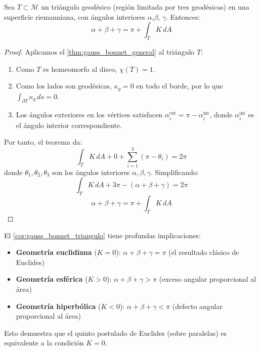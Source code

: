 \begin{corollary}\label{cor:gauss_bonnet_triangulo}
Sea $T \subset \mathcal{M}$ un triángulo geodésico (región limitada por tres geodésicas) en una superficie riemanniana, con ángulos interiores $\alpha$,$\beta$, $\gamma$. Entonces:
\begin{equation}\label{eq:gauss_bonnet_triangulo_apendice}
\alpha + \beta + \gamma = \pi + \int_T K \, dA
\end{equation}
\end{corollary}

\begin{proof}
Aplicamos el \autoref{thm:gauss_bonnet_general} al triángulo $T$:
\begin{enumerate}
    \item Como $T$ es homeomorfo al disco, $\chi(T) = 1$.
    \item Como los lados son geodésicas, $\kappa_g = 0$ en todo el borde, por lo  que $\int_{\partial T} \kappa_g \, ds = 0$.
    \item Los ángulos exteriores en los vértices satisfacen $\alpha_i^{\text{ext}} = \pi - \alpha_i^{\text{int}}$, donde $\alpha_i^{\text{int}}$ es el ángulo interior correspondiente.
\end{enumerate}

Por tanto, el teorema da:
\[
\int_T K \, dA + 0 + \sum_{i=1}^3 (\pi - \theta_i) = 2\pi
\]
donde $\theta_1, \theta_2, \theta_3$ son los ángulos interiores $\alpha, \beta, \gamma$. Simplificando:
\[
\int_T K \, dA + 3\pi - (\alpha + \beta + \gamma) = 2\pi
\]
\[
\alpha + \beta + \gamma = \pi + \int_T K \, dA
\]
\end{proof}

\begin{remark}
El \autoref{cor:gauss_bonnet_triangulo} tiene profundas implicaciones:
\begin{itemize}
    \item \textbf{Geometría euclidiana} ($K = 0$): $\alpha + \beta + \gamma = \pi$ (el resultado clásico de Euclides)
    \item \textbf{Geometría esférica} ($K > 0$): $\alpha + \beta + \gamma > \pi$ (exceso angular proporcional al área)
    \item \textbf{Geometría hiperbólica} ($K < 0$): $\alpha + \beta + \gamma < \pi$ (defecto angular proporcional al área)
\end{itemize}
Esto demuestra que el quinto postulado de Euclides (sobre paralelas) es equivalente a la condición $K = 0$.
\end{remark}


